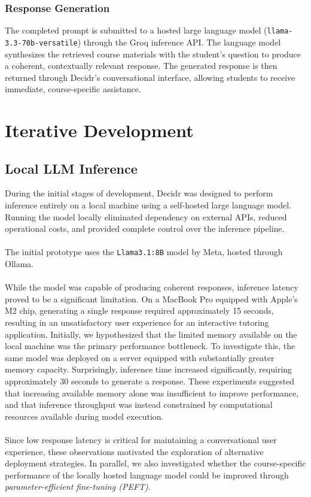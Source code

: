 \documentclass[12pt, a4paper]{report}
\begin{document}
\subsection{Response Generation}
The completed prompt is submitted to a hosted large language model (\texttt{llama-3.3-70b-versatile}) through the Groq inference API. The language model synthesizes the retrieved course materials with the student's question to produce a coherent, contextually relevant response. The generated response is then returned through Decidr's conversational interface, allowing students to receive immediate, course-specific assistance.

\chapter{Iterative Development}
\section{Local LLM Inference}
During the initial stages of development, Decidr was designed to perform inference entirely on a local machine using a self-hosted large language model. Running the model locally eliminated dependency on external APIs, reduced operational costs, and provided complete control over the inference pipeline.~\\~\\
The initial prototype uses the \texttt{Llama3.1:8B} model by Meta, hosted through Ollama.~\\~\\
While the model was capable of producing coherent responses, inference latency proved to be a significant limitation. On a MacBook Pro equipped with Apple's M2 chip, generating a single response required approximately 15 seconds, resulting in an unsatisfactory user experience for an interactive tutoring application. Initially, we hypothesized that the limited memory available on the local machine was the primary performance bottleneck. To investigate this, the same model was deployed on a server equipped with substantially greater memory capacity. Surprisingly, inference time increased significantly, requiring approximately 30 seconds to generate a response. These experiments suggested that increasing available memory alone was insufficient to improve performance, and that inference throughput was instead constrained by computational resources available during model execution.~\\~\\
Since low response latency is critical for maintaining a conversational user experience, these observations motivated the exploration of alternative deployment strategies. In parallel, we also investigated whether the course-specific performance of the locally hosted language model could be improved through \textit{parameter-efficient fine-tuning (PEFT)}.
\end{document}
